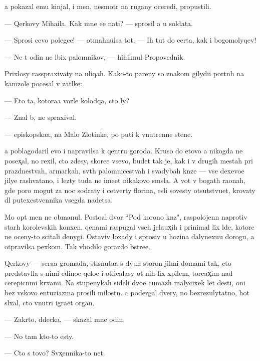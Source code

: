 \documentclass[10pt]{book}
\begin{document}
{\Y}a pokazal {\y}emu kinjal, i men{\ia}, nesmotr{\ia} na rugany oceredi, propustili.

— Qerkovy Miha{\y}ila. Kak mne {\y}e{\y}e na{\y}ti? — sprosil {\y}a u soldata.

— Sprosi cevo polegce! — otmahnulsa tot. — Ih tut do certa, kak i bogomolyqev!

— Ne t{\yi} odin ne l{\iu}bix palomnikov, — hihiknul Propovednik.

Prixlosy rasspraxivaty na uliqah. Kako{\y}-to pareny so znakom gilydi{\y}i portn{\yi}h na kamzole pocesal v zat{\yi}lke:

— Eto ta, kotora{\y}a vozle kolodqa, cto ly?

— Znal b{\yi}, ne spraxival.

— {\Y}episkopska{\y}a, na Malo{\y} Zlotinke, po puti k vnutrenne{\y} stene.

{\Y}a poblagodaril {\y}evo i napravilsa k qentru goroda. Kruso do etovo {\y}a nikogda ne posex̨al, no rexil, cto zdesy, skore{\y}e vsevo, budet tak je, kak i v drugih mestah pri prazdnestvah, {\y}armarkah, sv{\ia}t{\yi}h palomnicestvah i svadybah kn{\ia}ze{\y} — vse dexevo{\y}e jilye rashvatano, i lezty tuda ne ime{\y}et nikakovo sm{\yi}sla. A vot v bogat{\yi}h ra{\y}onah, gde poro{\y} mogut za noc sodraty i cetverty florina, {\y}esli sovesty otsutstvu{\y}et, krovaty dl{\ia} putexestvennika vsegda na{\y}detsa.

Mo{\y} op{\yi}t men{\ia} ne obmanul. Posto{\y}al{\yi}{\y} dvor ``Pod korono{\y} kn{\ia}z{\ia}", raspolojenn{\yi}{\y} naprotiv star{\yi}h korolevskih kon{\iu}xen, qenami raspugal vseh jela{\y}ux̨ih i prinimal lix l{\iu}de{\y}, kotor{\yi}{\y}e ne oceny-to scitali denygi. Ostaviv loxady i sprosiv u hoz{\ia}{\y}ina dalyne{\y}xu{\y}u dorogu, {\y}a otpravilsa pexkom. Tak v{\yi}hodilo gorazdo b{\yi}stre{\y}e.

Qerkovy — sera{\y}a gromada, stisnuta{\y}a s dvuh storon jil{\yi}mi domami tak, cto predstavl{\ia}la s nimi {\y}edino{\y}e qelo{\y}e i otlicalasy ot nih lix xpilem, torcax̨im nad cerepicn{\yi}mi kr{\yi}xami. Na stupenykah sideli dvo{\y}e cumaz{\yi}h malycixek let des{\ia}ti, oni bez vs{\ia}kovo entuziazma prosili milost{\yi}n{\iu}. {\Y}a podergal dvery, no bezrezulytatno, hot{\ia} sl{\yi}xal, cto vnutri igra{\y}et organ.

— Zakr{\yi}to, d{\ia}decka, — skazal mne odin.

— No tam kto-to {\y}esty.

— Cto s tovo? Sv{\ia}x̨ennika-to net.
\end{document}
